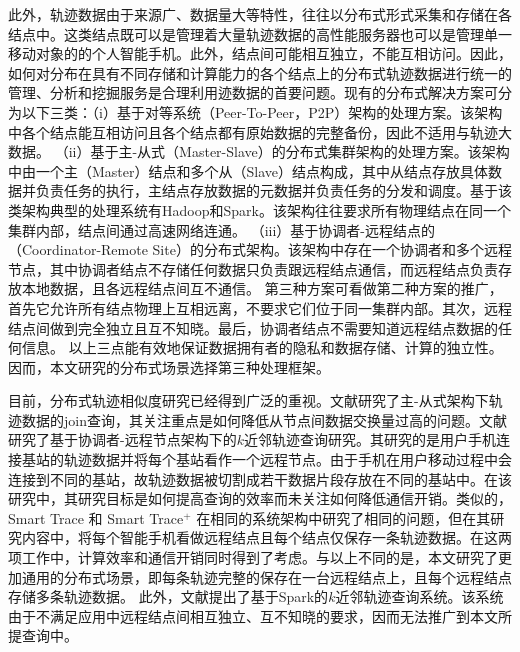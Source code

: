          此外，轨迹数据由于来源广、数据量大等特性，往往以分布式形式采集和存储在各结点中。这类结点既可以是管理着大量轨迹数据的高性能服务器也可以是管理单一移动对象的的个人智能手机。此外，结点间可能相互独立，不能互相访问。因此，
         如何对分布在具有不同存储和计算能力的各个结点上的分布式轨迹数据进行统一的管理、分析和挖掘服务是合理利用迹数据的首要问题。现有的分布式解决方案可分为以下三类：（i）基于对等系统（Peer-To-Peer，P2P）架构的处理方案。该架构中各个结点能互相访问且各个结点都有原始数据的完整备份，因此不适用与轨迹大数据。
         （ii）基于主-从式（Master-Slave）的分布式集群架构的处理方案。该架构中由一个主（Master）结点和多个从（Slave）结点构成，其中从结点存放具体数据并负责任务的执行，主结点存放数据的元数据并负责任务的分发和调度。基于该类架构典型的处理系统有Hadoop和Spark。该架构往往要求所有物理结点在同一个集群内部，结点间通过高速网络连通。
         （iii）基于协调者-远程结点的（Coordinator-Remote Site）的分布式架构。该架构中存在一个协调者和多个远程节点，其中协调者结点不存储任何数据只负责跟远程结点通信，而远程结点负责存放本地数据，且各远程结点间互不通信。 
         第三种方案可看做第二种方案的推广，首先它允许所有结点物理上互相远离，不要求它们位于同一集群内部。其次，远程结点间做到完全独立且互不知晓。最后，协调者结点不需要知道远程结点数据的任何信息。
         以上三点能有效地保证数据拥有者的隐私和数据存储、计算的独立性。因而，本文研究的分布式场景选择第三种处理框架。
  
  目前，分布式轨迹相似度研究已经得到广泛的重视。文献\cite{setSimilar,kimICDE2012}研究了主-从式架构下轨迹数据的join查询，其关注重点是如何降低从节点间数据交换量过高的问题。文献\cite{CIKMSimilarity} 研究了基于协调者-远程节点架构下的$k$近邻轨迹查询研究。其研究的是用户手机连接基站的轨迹数据并将每个基站看作一个远程节点。由于手机在用户移动过程中会连接到不同的基站，故轨迹数据被切割成若干数据片段存放在不同的基站中。在该研究中，其研究目标是如何提高查询的效率而未关注如何降低通信开销。类似的，
Smart Trace\cite{SmartTrace} 和 Smart Trace$^{+}$ \cite{crowdsourced} 在相同的系统架构中研究了相同的问题，但在其研究内容中，将每个智能手机看做远程结点且每个结点仅保存一条轨迹数据。在这两项工作中，计算效率和通信开销同时得到了考虑。与以上不同的是，本文研究了更加通用的分布式场景，即每条轨迹完整的保存在一台远程结点上，且每个远程结点存储多条轨迹数据。
此外，文献\cite{trajectoryVLDB}提出了基于Spark的$k$近邻轨迹查询系统。该系统由于不满足应用中远程结点间相互独立、互不知晓的要求，因而无法推广到本文所提查询中。
  

